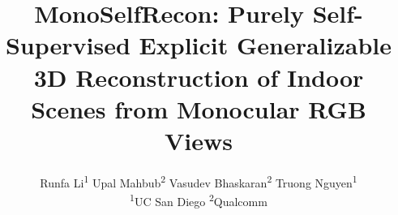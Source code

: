\documentclass[10pt,twocolumn,letterpaper]{article}
\title{MonoSelfRecon: Purely Self-Supervised Explicit Generalizable 3D Reconstruction of Indoor Scenes from Monocular RGB Views}
\author{Runfa Li\textsuperscript{1} \quad
Upal Mahbub\textsuperscript{2} \quad
Vasudev Bhaskaran\textsuperscript{2} \quad
Truong Nguyen\textsuperscript{1} \quad
\\
\textsuperscript{1}UC San Diego \quad
\textsuperscript{2}Qualcomm %
}
\begin{document}
\maketitle
    






{
    \small
    
    
}



\end{document}
